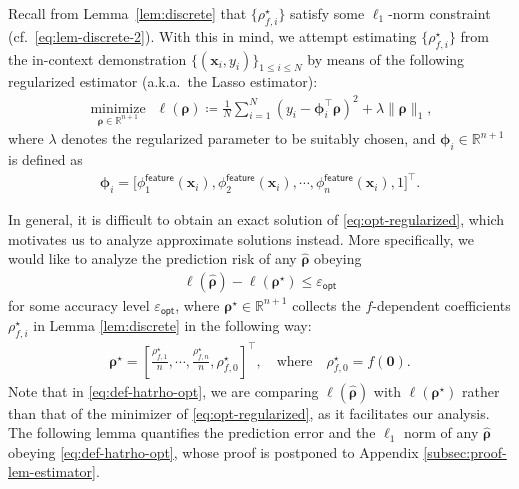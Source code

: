 \documentclass[english]{article}
\begin{document}
Recall from  Lemma~\ref{lem:discrete} that $\{\rho^{\star}_{f,i}\}$ satisfy some $\ell_1$-norm constraint (cf.~\eqref{eq:lem-discrete-2}). With this in mind, 
we attempt estimating $\{\rho^{\star}_{f,i}\}$ from the in-context demonstration $\{(\bm{x}_i,y_i)\}_{1\leq i\leq N}$ by means of the following regularized estimator (a.k.a.~the Lasso estimator): 
%
%
\begin{align}\label{eq:opt-regularized}
\mathop{\text{minimize}}\limits_{\bm{\rho}\in \mathbb{R}^{n+1}}~~\ell({\bm \rho}) \coloneqq  \frac{1}{N}\sum_{i = 1}^N (y_i - {\bm \phi}_i^{\top}{\bm \rho})^2 + \lambda \|{\bm \rho}\|_1,
\end{align}
%
where $\lambda$ denotes the regularized parameter to be suitably chosen, and  
${\bm \phi}_i \in \mathbb{R}^{n+1}$ is defined as 
%
\begin{align}
\label{eq:defn-phi-i-features}
\bm{\phi}_{i}=\big[\phi_{1}^{\mathsf{feature}}(\bm{x}_i),\phi_{2}^{\mathsf{feature}}(\bm{x}_i),\cdots,\phi_{n}^{\mathsf{feature}}(\bm{x}_i),1\big]^{\top}.
\end{align}
%
%

In general, it is difficult to obtain an exact solution of \eqref{eq:opt-regularized}, which motivates us to analyze approximate solutions instead. More specifically, we would like to analyze the prediction risk of any $\widehat{\bm{\rho}}$ obeying
%
\begin{align}\label{eq:def-hatrho-opt}
\ell(\widehat{{\bm \rho}}) - \ell({{\bm \rho}}^{\star})\le \varepsilon_{\mathsf{opt}}
\end{align}
%
for some accuracy level $\varepsilon_{\mathsf{opt}}$, 
where ${\bm \rho}^{\star}\in \mathbb{R}^{n+1}$ collects the $f$-dependent coefficients $\rho^{\star}_{f,i}$  in Lemma \ref{lem:discrete} in the following way: 
%
\begin{align}\label{eq:def-rho-star}
{\bm \rho}^{\star} = \left[\frac{\rho^{\star}_{f,1}}{n},\cdots,\frac{\rho^{\star}_{f,n}}{n},\rho^{\star}_{f,0}\right]^{\top},\quad \mathrm{where}\quad 
\rho^{\star}_{f,0}= f({\bm 0}).
\end{align}
%
Note that in \eqref{eq:def-hatrho-opt}, we are comparing $\ell(\widehat{\bm{\rho}})$ with $\ell(\bm{\rho}^{\star})$ rather than that of the minimizer of \eqref{eq:opt-regularized}, as it facilitates our analysis.  
The following lemma quantifies the prediction error and the $\ell_1$ norm of any $\widehat{\bm \rho}$ obeying \eqref{eq:def-hatrho-opt}, whose proof is postponed to Appendix \ref{subsec:proof-lem-estimator}.
\end{document}
